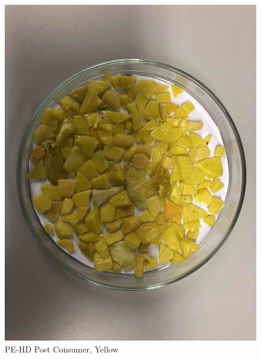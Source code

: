 \begin{appendices}
\begin{figure}
    \centering
    \includegraphics[width = 12cm]{Images/appendix/PE-Regrind-(Post-Consumer)-yellow.jpg}
    \caption{PE-HD Post Consumer, Yellow}
    \label{fig:pehd-yellow}
\end{figure}


\end{appendices}
